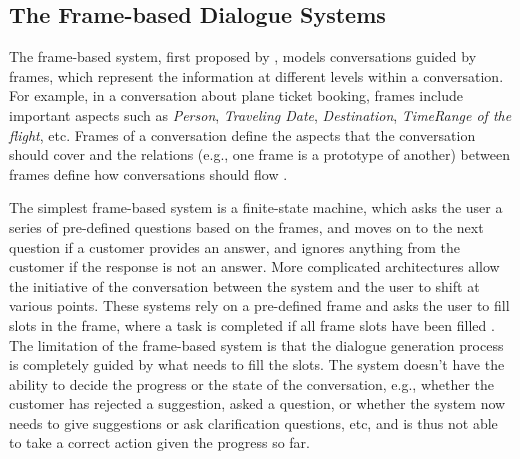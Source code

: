 \subsection{The Frame-based  Dialogue Systems}
The frame-based system, first proposed by , models conversations  guided by frames, which represent the information at different 
levels within a conversation. 
For example, in a conversation about plane ticket booking, frames include 
important aspects such as 
{\it Person}, {\it Traveling Date}, 
{\it Destination}, {\it TimeRange of the flight}, etc. 
Frames of a conversation define the aspects that the conversation should cover and the relations (e.g., one frame is a prototype of another)
between frames
define how conversations should flow  \cite{walker1990mixed,seneff1992tina,chu1997tracking,san2001designing,seneff2002response}. 

  The simplest frame-based system is a finite-state machine, which asks the user a series of pre-defined questions based on the frames,
  and moves on to the next question
    if a customer provides an answer, and 
     ignores anything from the 
  customer if the response is not an answer. 
More complicated architectures
 allow the initiative of the conversation between the system and the user to shift at various points.
 These systems rely on a pre-defined frame and asks the user to fill slots in the frame, where a task is completed if all frame slots 
 have been filled . 
The limitation of the frame-based system is that the dialogue generation process is completely guided by what needs  to fill the slots. The system doesn't
have the ability to decide the progress
or the state
 of the conversation, e.g., whether the customer has rejected a suggestion, asked a question, or whether the system now needs to 
give suggestions or ask clarification questions, etc, and is thus not able to take a correct action given the progress so far.

